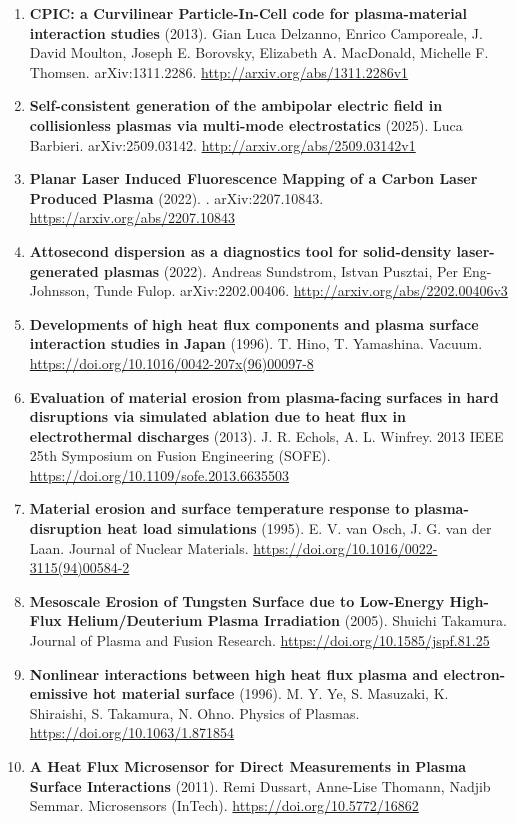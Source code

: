 \documentclass[11pt,a4paper]{article}
\begin{document}
\begin{enumerate}[leftmargin=1.4em]
\item \textbf{CPIC: a Curvilinear Particle-In-Cell code for plasma-material interaction studies} (2013). Gian Luca Delzanno, Enrico Camporeale, J. David Moulton, Joseph E. Borovsky, Elizabeth A. MacDonald, Michelle F. Thomsen. arXiv:1311.2286. \url{http://arxiv.org/abs/1311.2286v1}
\item \textbf{Self-consistent generation of the ambipolar electric field in collisionless plasmas via multi-mode electrostatics} (2025). Luca Barbieri. arXiv:2509.03142. \url{http://arxiv.org/abs/2509.03142v1}
\item \textbf{Planar Laser Induced Fluorescence Mapping of a Carbon Laser Produced Plasma} (2022). . arXiv:2207.10843. \url{https://arxiv.org/abs/2207.10843}
\item \textbf{Attosecond dispersion as a diagnostics tool for solid-density laser-generated plasmas} (2022). Andreas Sundstrom, Istvan Pusztai, Per Eng-Johnsson, Tunde Fulop. arXiv:2202.00406. \url{http://arxiv.org/abs/2202.00406v3}
\item \textbf{Developments of high heat flux components and plasma surface interaction studies in Japan} (1996). T. Hino, T. Yamashina. Vacuum. \url{https://doi.org/10.1016/0042-207x(96)00097-8}
\item \textbf{Evaluation of material erosion from plasma-facing surfaces in hard disruptions via simulated ablation due to heat flux in electrothermal discharges} (2013). J. R. Echols, A. L. Winfrey. 2013 IEEE 25th Symposium on Fusion Engineering (SOFE). \url{https://doi.org/10.1109/sofe.2013.6635503}
\item \textbf{Material erosion and surface temperature response to plasma-disruption heat load simulations} (1995). E. V. van Osch, J. G. van der Laan. Journal of Nuclear Materials. \url{https://doi.org/10.1016/0022-3115(94)00584-2}
\item \textbf{Mesoscale Erosion of Tungsten Surface due to Low-Energy High-Flux Helium/Deuterium Plasma Irradiation} (2005). Shuichi Takamura. Journal of Plasma and Fusion Research. \url{https://doi.org/10.1585/jspf.81.25}
\item \textbf{Nonlinear interactions between high heat flux plasma and electron-emissive hot material surface} (1996). M. Y. Ye, S. Masuzaki, K. Shiraishi, S. Takamura, N. Ohno. Physics of Plasmas. \url{https://doi.org/10.1063/1.871854}
\item \textbf{A Heat Flux Microsensor for Direct Measurements in Plasma Surface Interactions} (2011). Remi Dussart, Anne-Lise Thomann, Nadjib Semmar. Microsensors (InTech). \url{https://doi.org/10.5772/16862}

\end{enumerate}
\end{document}
